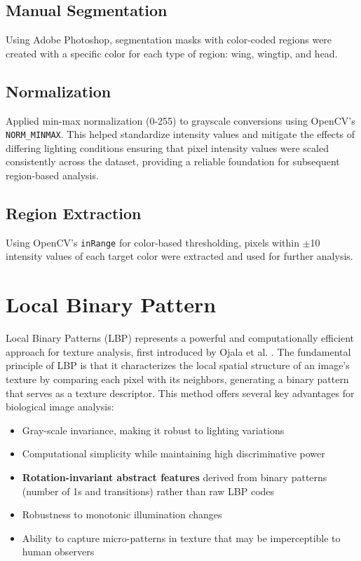 \documentclass[a4paper,12pt]{report}
\begin{document}
\subsection{Manual Segmentation}
Using Adobe Photoshop, segmentation masks with color-coded regions were created with a specific color for each type of region: wing, wingtip, and head.

\subsection{Normalization}
Applied min-max normalization\citep{monzon_image_normalization} (0-255) to grayscale conversions using OpenCV's \texttt{NORM\_MINMAX}.
This helped standardize intensity values and mitigate the effects of differing lighting conditions ensuring that pixel intensity values were scaled consistently across the dataset, providing a reliable foundation for subsequent region-based analysis.

\subsection{Region Extraction}

Using OpenCV's \texttt{inRange} for color-based thresholding, pixels within $\pm$10 intensity values of each target color were extracted and used for further analysis.

\section{Local Binary Pattern}

Local Binary Patterns (LBP) represents a powerful and computationally efficient approach for texture analysis, first introduced by Ojala et al. . The fundamental principle of LBP is that it characterizes the local spatial structure of an image's texture by comparing each pixel with its neighbors, generating a binary pattern that serves as a texture descriptor. This method offers several key advantages for biological image analysis:

\begin{itemize}
    \item Gray-scale invariance, making it robust to lighting variations
    \item Computational simplicity while maintaining high discriminative power
    \item \textbf{Rotation-invariant abstract features} derived from binary patterns (number of 1s and transitions) rather than raw LBP codes
    \item Robustness to monotonic illumination changes
    \item Ability to capture micro-patterns in texture that may be imperceptible to human observers
\end{itemize}
\end{document}
